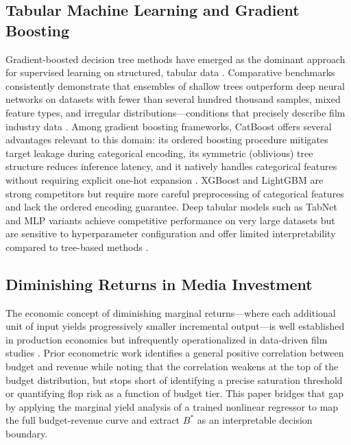 \documentclass[journal]{IEEEtran}
\begin{document}
\subsection{Tabular Machine Learning and Gradient Boosting}

Gradient-boosted decision tree methods have emerged as the dominant approach for supervised learning on structured, tabular data \cite{wang2025tabularbench}. Comparative benchmarks consistently demonstrate that ensembles of shallow trees outperform deep neural networks on datasets with fewer than several hundred thousand samples, mixed feature types, and irregular distributions—conditions that precisely describe film industry data \cite{li2025entertainmentML}. Among gradient boosting frameworks, CatBoost offers several advantages relevant to this domain: its ordered boosting procedure mitigates target leakage during categorical encoding, its symmetric (oblivious) tree structure reduces inference latency, and it natively handles categorical features without requiring explicit one-hot expansion \cite{dorogush2025catboost}. XGBoost and LightGBM are strong competitors but require more careful preprocessing of categorical features and lack the ordered encoding guarantee. Deep tabular models such as TabNet and MLP variants achieve competitive performance on very large datasets but are sensitive to hyperparameter configuration and offer limited interpretability compared to tree-based methods \cite{gorishniy2025tabsurvey}.

\subsection{Diminishing Returns in Media Investment}

The economic concept of diminishing marginal returns—where each additional unit of input yields progressively smaller incremental output—is well established in production economics but infrequently operationalized in data-driven film studies \cite{park2025mediareturns}. Prior econometric work identifies a general positive correlation between budget and revenue while noting that the correlation weakens at the top of the budget distribution, but stops short of identifying a precise saturation threshold or quantifying flop risk as a function of budget tier. This paper bridges that gap by applying the marginal yield analysis of a trained nonlinear regressor to map the full budget-revenue curve and extract \(B^*\) as an interpretable decision boundary.

\end{document}
